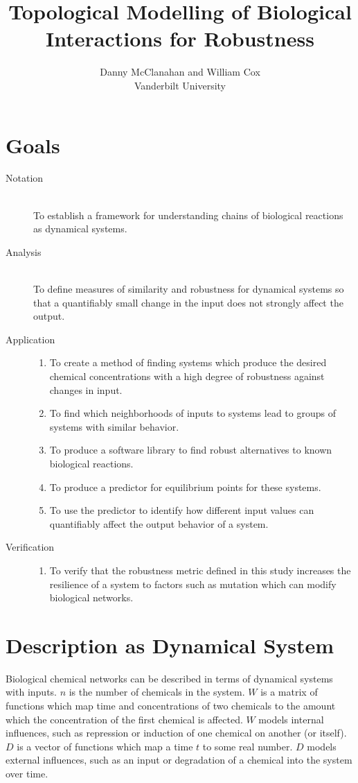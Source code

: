 \documentclass{article}
\title{Topological Modelling of Biological Interactions for Robustness}
\author{Danny McClanahan and William Cox \\
Vanderbilt University}
\date{}
\begin{document}
\maketitle
\vspace{-25pt}

\section{Goals}
\begin{description}
\item[Notation] \hfill \\
  To establish a framework for understanding chains of biological reactions as dynamical systems.
\item[Analysis] \hfill \\
  To define measures of similarity and robustness for dynamical systems so that a quantifiably small change in the input does not strongly affect the output.
\item[Application] \hfill
  \begin{enumerate}
  \item To create a method of finding systems which produce the desired chemical concentrations with a high degree of robustness against changes in input.
  \item To find which neighborhoods of inputs to systems lead to groups of systems with similar behavior.
  \item To produce a software library to find robust alternatives to known biological reactions.
  \item To produce a predictor for equilibrium points for these systems.
  \item To use the predictor to identify how different input values can quantifiably affect the output behavior of a system.
  \end{enumerate}
\item[Verification] \hfill
  \begin{enumerate}
  \item To verify that the robustness metric defined in this study increases the resilience of a system to factors such as mutation which can modify biological networks.
  \end{enumerate}
\end{description}

\section{Description as Dynamical System} \label{description}
Biological chemical networks can be described in terms of dynamical systems with inputs. $n$ is the number of chemicals in the system. $W$ is a matrix of functions which map time and concentrations of two chemicals to the amount which the concentration of the first chemical is affected. $W$ models internal influences, such as repression or induction of one chemical on another (or itself). $D$ is a vector of functions which map a time $t$ to some real number. $D$ models external influences, such as an input or degradation of a chemical into the system over time.
\end{document}
